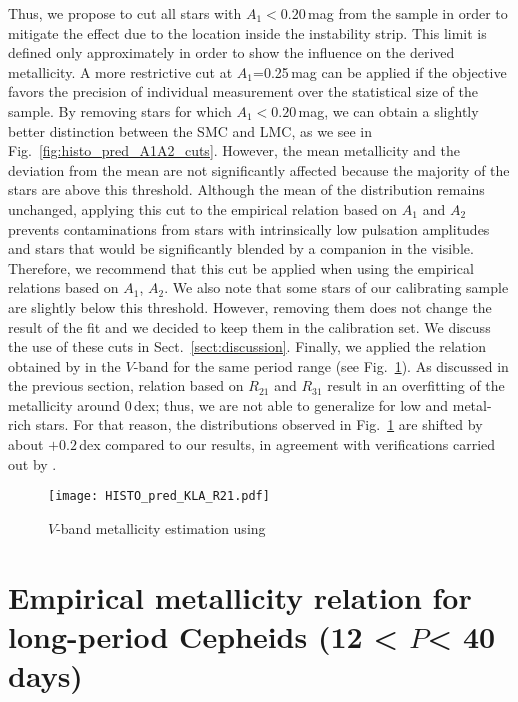 \documentclass[article]{aa} %
\begin{document}
Thus, we propose to cut all stars with $A_1<0.20\,$mag from the sample  in order to mitigate the effect due to the location inside the instability strip. This limit is defined only approximately in order to show the influence on the derived metallicity. A more restrictive cut at $A_{1}$=0.25$\,$mag can be applied if the objective favors the precision of individual measurement over the statistical size of the sample. By removing stars for which $A_1<0.20\,$mag, we can obtain a slightly better distinction between the SMC and LMC, as we see in Fig.~\ref{fig:histo_pred_A1A2_cuts}. However, the mean metallicity and the deviation from the mean are not significantly affected because the majority of the stars are above this threshold. Although the mean of the distribution remains unchanged, applying this cut to the empirical relation based on $A_1$ and $A_2$ prevents contaminations from stars with intrinsically low pulsation amplitudes and stars that would be significantly blended by a companion in the visible. Therefore, we recommend that this cut be  applied when using the empirical relations based on $A_1$, $A_2$.
We also note that some stars of our calibrating sample are slightly below this threshold. However, removing them does not change the result of the fit and we decided to keep them in the calibration set. We discuss the use of these cuts in Sect.~\ref{sect:discussion}. Finally, we applied the relation obtained by \cite{Klagyivik2013} in the $V$-band for the same period range (see Fig.~\ref{fig:histo_KLA_V}). As discussed in the previous section, relation based on $R_{21}$ and $R_{31}$ result in an overfitting of the metallicity around $0\,$dex; thus, we are not able to generalize for low and metal-rich stars. For that reason, the distributions observed in Fig.~\ref{fig:histo_KLA_V} are shifted by about $+0.2\,$dex compared to our results, in agreement with verifications carried out by \cite{Clementini2019}.

\begin{figure}
\begin{center}
\texttt{[image: HISTO\_pred\_KLA\_R21.pdf]}
\caption{\small $V$-band metallicity estimation using \citep{Klagyivik2013} \label{fig:histo_KLA_V}}
\end{center}
\end{figure}




\section{Empirical metallicity relation for long-period Cepheids (12 < $P$< 40 days)}\label{sect:Z_long}
\end{document}
